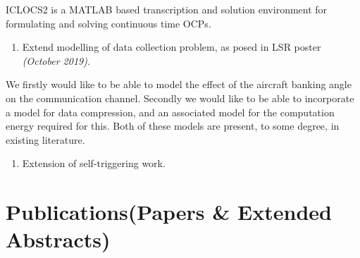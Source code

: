 \documentclass{article}
\begin{document}
\noindent ICLOCS2 is a MATLAB based transcription and solution environment for formulating and solving continuous time OCPs. 

\begin{enumerate}[resume=myouterlist]
    \item Extend modelling of data collection problem, as posed in LSR poster \textit{(October 2019)}.
\end{enumerate}

\noindent We firstly would like to be able to model the effect of the aircraft banking angle on the communication channel. Secondly we would like to be able to incorporate a model for data compression, and an associated model for the computation energy required for this. Both of these models are present, to some degree, in existing literature. 

\begin{enumerate}[resume=myouterlist]
    \item Extension of self-triggering work.  
\end{enumerate}



\section{Publications(Papers \& Extended Abstracts)}
\nocite{*}

 

\end{document}

